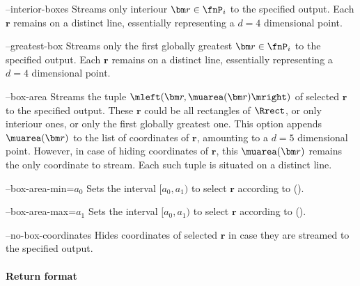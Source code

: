 \begin{procarg}{--interior-boxes}
  Streams only interiour $\bm r \in \fnP_i$ to the specified output. Each $\bm r$ remains on a distinct line, essentially representing a $d=4$ dimensional point.
\end{procarg}

\begin{procarg}{--greatest-box}
  Streams only the first globally greatest $\bm r \in \fnP_i$ to the specified output. Each $\bm r$ remains on a distinct line, essentially representing a $d=4$ dimensional point.
\end{procarg}

\begin{procarg}{--box-area}
  Streams the tuple $\mleft(\bm r, \muarea(\bm r)\mright)$ of selected $\bm r$ to the specified output. These $\bm r$ could be all rectangles of $\Rrect$, or only interiour ones, or only the first globally greatest one. This option appends $\muarea(\bm r)$ to the list of coordinates of $\bm r$, amounting to a $d=5$ dimensional point. However, in case of hiding coordinates of $\bm r$, this $\muarea(\bm r)$ remains the only coordinate to stream. Each such tuple is situated on a distinct line.
\end{procarg}

\begin{procarg}{--box-area-min=$a_0$}
  Sets the interval $[a_0, a_1)$ to select $\bm r$ according to ().
\end{procarg}

\begin{procarg}{--box-area-max=$a_1$}
  Sets the interval $[a_0, a_1)$ to select $\bm r$ according to ().
\end{procarg}

\begin{procarg}{--no-box-coordinates}
  Hides coordinates of selected $\bm r$ in case they are streamed to the specified output.
\end{procarg}

\procargsilent


\paragraph{Return format}

